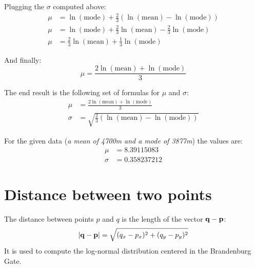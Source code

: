 \documentclass[a4paper,12pt]{article}
\begin{document}
Plugging the \(\sigma\) computed above:
\begin{align*}
  \mu &= \ln(\mbox{mode}) + \frac{2}{3}\left(\ln(\mbox{mean}) - \ln(\mbox{mode})\right)\\
  \mu &= \ln(\mbox{mode}) + \frac{2}{3}\ln(\mbox{mean}) - \frac{2}{3}\ln(\mbox{mode})\\
  \mu &= \frac{2}{3}\ln(\mbox{mean}) + \frac{1}{3}\ln(\mbox{mode})
\end{align*}

And finally:
\[\mu = \frac{2\ln(\mbox{mean}) + \ln(\mbox{mode})}{3}\tag{\(\mu\)}\]

The end result is the following set of formulas for \(\mu\) and \(\sigma\):
\begin{align*}
  \mu &= \frac{2\ln(\mbox{mean}) + \ln(\mbox{mode})}{3}\tag{\(\mu\)}\\
  \sigma &= \sqrt{\frac{2}{3}\left(\ln(\mbox{mean}) - \ln(\mbox{mode})\right)\tag{\(\sigma\)}}
\end{align*}

For the given data (\emph{a mean of 4700m and a mode of 3877m}) the values are:
\begin{align*}
  \mu &= 8.39115083\\
  \sigma &= 0.358237212
\end{align*}


\section{Distance between two points}

The distance between points \(p\) and \(q\) is the length of the vector \(\vb{q - p}\):
\[\abs{\vb{q - p}} = \sqrt{(q_x - p_x)^2 + (q_y - p_y)^2}\]
It is used to compute the log-normal distribution centered in the Brandenburg Gate.
\end{document}
